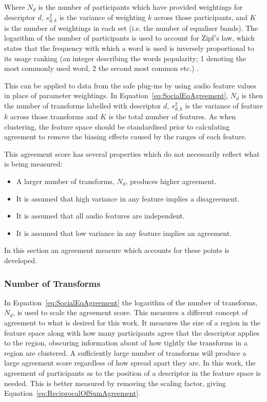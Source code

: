 		Where $N_{d}$ is the number of participants which have provided weightings for descriptor $d$,
		$s_{d,k}^{2}$ is the variance of weighting $k$ across those participants, and $K$ is the number of
		weightings in each set (i.e. the number of equaliser bands). The logarithm of the number of
		participants is used to account for Zipf's law, which states that the frequency with which a word is used
		is inversely proportional to its usage ranking (an integer describing the words popularity; 1 denoting the
		most commonly used word, 2 the second most common etc.) \citep{manning1999foundations}.

		This can be applied to data from the \acrshort{safe} plug-ins by using audio feature values in place of
		parameter weightings. In Equation~\ref{eq:SocialEqAgreement}, $N_{d}$ is then the number of transforms
		labelled with descriptor $d$, $s_{d,k}^{2}$ is the variance of feature $k$ across those transforms and $K$
		is the total number of features. As when clustering, the feature space should be standardised prior to
		calculating agreement to remove the biasing effects caused by the ranges of each feature.

		This agreement score has several properties which do not necessarily reflect what is being measured:

		\begin{itemize}
			\item A larger number of transforms, $N_{d}$, produces higher agreement.
			\item It is assumed that high variance in any feature implies a disagreement. 
			\item It is assumed that all audio features are independent. 
			\item It is assumed that low variance in any feature implies an agreement. 
		\end{itemize}

		In this section an agreement measure which accounts for these points is developed.

		\subsubsection*{Number of Transforms}
			In Equation~\ref{eq:SocialEqAgreement} the logarithm of the number of transforms, $N_{d}$, is used
			to scale the agreement score. This measures a different concept of agreement to what is desired for
			this work. It measures the size of a region in the feature space along with how many participants
			agree that the descriptor applies to the region, obscuring information about of how tightly the
			transforms in a region are clustered. A sufficiently large number of transforms will produce a
			large agreement score regardless of how spread apart they are. In this work, the agreement of
			participants as to the position of a descriptor in the feature space is needed. This is better
			measured by removing the scaling factor, giving Equation~\ref{eq:ReciprocalOfSumAgreement}.

